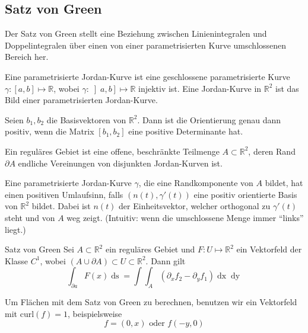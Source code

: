 \documentclass[a4paper,fontsize = 8pt]{scrartcl}
\def\R{\mathbb{R}}
\begin{document}
\subsection{Satz von Green}
Der Satz von Green stellt eine Beziehung zwischen Linienintegralen und Doppelintegralen über einen von einer parametrisierten Kurve umschlossenen Bereich her. 

Eine parametrisierte Jordan-Kurve ist eine geschlossene parametrisierte Kurve \(\gamma : \left[a,b\right] \mapsto \R\), wobei \(\gamma : \left] a,b \right] \mapsto \R\) injektiv ist. Eine Jordan-Kurve in \(\R^2\) ist das Bild einer parametrisierten Jordan-Kurve.

Seien \(b_1, b_2\) die Basisvektoren von \(\R^2\). Dann ist die Orientierung genau dann positiv, wenn die Matrix \(\left[b_1, b_2\right]\) eine positive Determinante hat.

Ein reguläres Gebiet ist eine offene, beschränkte Teilmenge \(A\subset \R^2\), deren Rand \(\partial A\) endliche Vereinungen von disjunkten Jordan-Kurven ist.

Eine parametrisierte Jordan-Kurve \(\gamma\), die eine Randkomponente von \(A\) bildet, hat einen positiven Umlaufsinn, falls \((n(t), \gamma'(t))\) eine positiv orientierte Basis von \(\R^2\) bildet. Dabei ist \(n(t)\) der Einheitsvektor, welcher orthogonal zu \(\gamma'(t)\) steht und von \(A\) weg zeigt. (Intuitiv: wenn die umschlossene Menge immer ``links'' liegt.)

\begin{mainbox}{Satz von Green}
  Sei \(A \subset \R^2\) ein reguläres Gebiet und \(F: U \mapsto \R^2\) ein Vektorfeld der Klasse \(C^1\), wobei \((A \cup \partial A) \subset U \subset \R^2\). Dann gilt
  \[\int_{\partial a} F(x) \mathop{ds} = \int \int_A \left(\partial_x f_2 - \partial_y f_1\right) \mathop{dx} \mathop{dy}\]
\end{mainbox}
Um Flächen mit dem Satz von Green zu berechnen, benutzen wir ein Vektorfeld mit \(\text{curl}(f) = 1\), beispielsweise \[f = (0,x) \text{ oder } f(-y, 0)\]
\end{document}
